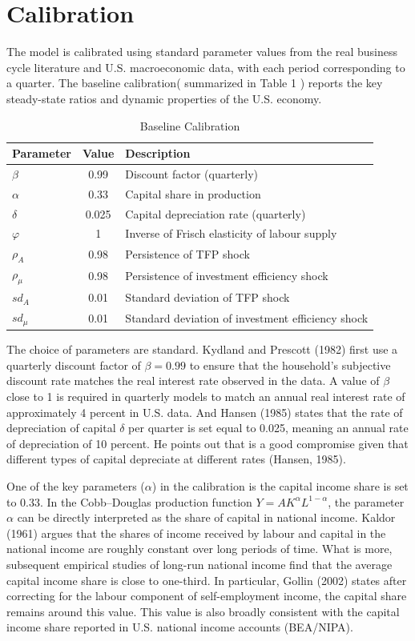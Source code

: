 \documentclass[12pt]{article}
\begin{document}
\section{Calibration}
The model is calibrated using standard parameter values from the real business cycle literature and U.S. macroeconomic data, with each period corresponding to a quarter. The baseline calibration( summarized in Table 1 ) reports the key steady-state ratios and dynamic properties of the U.S. economy.

\begin{table}[h!]
\centering
\caption{Baseline Calibration}
\begin{tabular}{l c l}
\hline\hline
\textbf{Parameter} & \textbf{Value} & \textbf{Description} \\
\hline
$\beta$      & 0.99  & Discount factor (quarterly) \\
$\alpha$     & 0.33  & Capital share in production \\
$\delta$     & 0.025 & Capital depreciation rate (quarterly) \\
$\varphi$    & 1     & Inverse of Frisch elasticity of labour supply \\
$\rho_A$     & 0.98  & Persistence of TFP shock \\
$\rho_{\mu}$ & 0.98  & Persistence of investment efficiency shock \\
$sd_A$       & 0.01  & Standard deviation of TFP shock \\
$sd_{\mu}$   & 0.01  & Standard deviation of investment efficiency shock \\
\hline\hline
\end{tabular}
\end{table}

The choice of parameters are standard. Kydland and Prescott (1982) first use a quarterly discount factor of $\beta=0.99$ to ensure that the household's subjective discount rate matches the real interest rate observed in the data. A value of $\beta$ close to 1 is required in quarterly models to match an annual real interest rate of approximately 4 percent in U.S. data. And Hansen (1985) states that the rate of depreciation of capital $\delta$ per quarter is set equal to 0.025, meaning an annual rate of depreciation of 10 percent. He points out that is a good compromise given that different types of capital depreciate at different rates (Hansen, 1985).
\par
One of the key parameters ($\alpha$) in the calibration is the capital income share is set to 0.33. In the Cobb--Douglas production function $Y = A K^{\alpha} L^{1-\alpha}$, the parameter $\alpha$ can be directly interpreted as the share of capital in national income. Kaldor (1961) argues that the shares of income received by labour and capital in the national income are roughly constant over long periods of time. What is more, subsequent empirical studies of long-run national income find that the average capital income share is close to one-third. In particular, Gollin (2002) states after correcting for the labour component of self-employment income, the capital share remains around this value. This value is also broadly consistent with the capital income share reported in U.S. national income accounts (BEA/NIPA).
\end{document}
